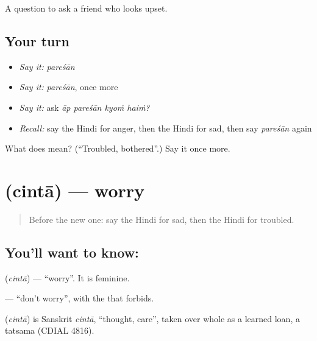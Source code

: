 \begin{grammarlens}[title={What you've built}]
A question to ask a friend who looks upset.
\end{grammarlens}

\subsection*{Your turn}
\begin{itemize}
\raggedright
  \item \emph{Say it:} \emph{pareśān}
  \item \emph{Say it:} \emph{pareśān}, once more
  \item \emph{Say it:} ask \emph{āp pareśān kyoṁ haiṁ?}
  \item \emph{Recall:} say the Hindi for anger, then the Hindi for sad, then say \emph{pareśān} again
\end{itemize}

\begin{tcolorbox}[breakable,colback=teal!4,colframe=teal!35!black,title={Before you move on}]
What does  mean? (\textquotedblleft{}Troubled, bothered\textquotedblright{}.) Say it once more.
\end{tcolorbox}
\section[\texorpdfstring{\hi{चिंता} (cintā)}{चिंता (cintā)}]{ (cintā) — worry}

\label{lesson:HI-C108-chinta}



\begin{quote}
Before the new one: say the Hindi for sad, then the Hindi for troubled.
\end{quote}

\subsection*{You'll want to know: }
\textbf{} (\emph{cintā}) — \textquotedblleft{}worry\textquotedblright{}. It is feminine.

\textbf{  } — \textquotedblleft{}don't worry\textquotedblright{}, with the \textbf{} that forbids.

\begin{cousinweb}
\textbf{} (\emph{cintā}) is Sanskrit \emph{cintā}, \textquotedblleft{}thought, care\textquotedblright{}, taken over whole as a learned loan, a tatsama (CDIAL 4816).
\end{cousinweb}

